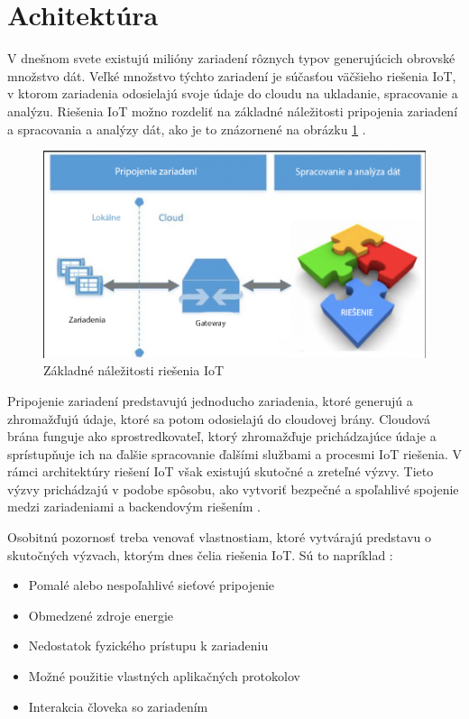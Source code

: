 \documentclass[twoside]{ctuthesis}
\theoremstyle{plain}
\theoremstyle{definition}
\theoremstyle{note}
\begin{document}
\section{Achitektúra}

V dnešnom svete existujú milióny zariadení rôznych typov generujúcich obrovské množstvo dát.
Veľké množstvo týchto zariadení je súčasťou väčšieho riešenia IoT, v ktorom zariadenia odosielajú svoje údaje do cloudu na ukladanie, spracovanie a analýzu. Riešenia IoT možno rozdeliť na základné náležitosti pripojenia zariadení a spracovania a analýzy dát, ako je to znázornené na obrázku \ref{fig:hub1} \cite{azureHub}.
\newline


\begin{figure}[H]
\includegraphics[width= 9.9 cm]{IoTHub1.png}
\caption{Základné náležitosti riešenia IoT  \cite{azureHub}}
\label{fig:hub1}
\end{figure}

Pripojenie zariadení predstavujú jednoducho zariadenia, ktoré generujú a zhromažďujú údaje, ktoré sa potom odosielajú do cloudovej brány. Cloudová brána funguje ako sprostredkovateľ, ktorý zhromažďuje prichádzajúce údaje a sprístupňuje ich
na ďalšie spracovanie ďalšími službami a procesmi IoT riešenia. V rámci architektúry riešení IoT však existujú skutočné a zreteľné výzvy. Tieto výzvy prichádzajú v podobe spôsobu, ako vytvoriť bezpečné a spoľahlivé spojenie medzi zariadeniami a backendovým riešením \cite{azureHub}. 
\newline

Osobitnú pozornosť treba venovať vlastnostiam, ktoré vytvárajú predstavu o skutočných výzvach, ktorým dnes čelia riešenia IoT. Sú to napríklad \cite{azureHub}:
\begin{itemize}
\item Pomalé alebo nespoľahlivé sieťové pripojenie
\item Obmedzené zdroje energie
\item Nedostatok fyzického prístupu k zariadeniu
\item Možné použitie vlastných aplikačných protokolov
\item Interakcia človeka so zariadením
\end{itemize}
\end{document}
